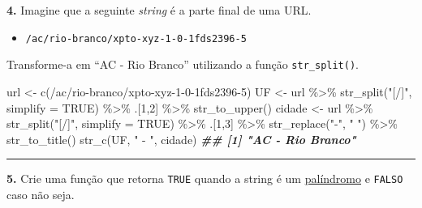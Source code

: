 \documentclass[
]{book}
\newenvironment{Shaded}{\begin{snugshade}}{\end{snugshade}}
\newcommand{\AttributeTok}[1]{\textcolor[rgb]{0.77,0.63,0.00}{#1}}
\newcommand{\ConstantTok}[1]{\textcolor[rgb]{0.00,0.00,0.00}{#1}}
\newcommand{\DecValTok}[1]{\textcolor[rgb]{0.00,0.00,0.81}{#1}}
\newcommand{\DocumentationTok}[1]{\textcolor[rgb]{0.56,0.35,0.01}{\textbf{\textit{#1}}}}
\newcommand{\FunctionTok}[1]{\textcolor[rgb]{0.00,0.00,0.00}{#1}}
\newcommand{\NormalTok}[1]{#1}
\newcommand{\OtherTok}[1]{\textcolor[rgb]{0.56,0.35,0.01}{#1}}
\newcommand{\SpecialCharTok}[1]{\textcolor[rgb]{0.00,0.00,0.00}{#1}}
\newcommand{\StringTok}[1]{\textcolor[rgb]{0.31,0.60,0.02}{#1}}
\providecommand{\tightlist}{%
  \setlength{\itemsep}{0pt}\setlength{\parskip}{0pt}}
\begin{document}
\textbf{4.} Imagine que a seguinte \emph{string} é a parte final de uma URL.

\begin{itemize}
\tightlist
\item
  \texttt{/ac/rio-branco/xpto-xyz-1-0-1fds2396-5}
\end{itemize}

Transforme-a em ``AC - Rio Branco'' utilizando a função \texttt{str\_split()}.

\begin{Shaded}
\begin{Highlighting}[]
\NormalTok{url }\OtherTok{\textless{}{-}} \FunctionTok{c}\NormalTok{(}\StringTok{\textquotesingle{}/ac/rio{-}branco/xpto{-}xyz{-}1{-}0{-}1fds2396{-}5\textquotesingle{}}\NormalTok{)}
\NormalTok{UF }\OtherTok{\textless{}{-}}\NormalTok{ url }\SpecialCharTok{\%\textgreater{}\%}
  \FunctionTok{str\_split}\NormalTok{(}\StringTok{"[/]"}\NormalTok{, }\AttributeTok{simplify =} \ConstantTok{TRUE}\NormalTok{) }\SpecialCharTok{\%\textgreater{}\%} 
\NormalTok{  .[}\DecValTok{1}\NormalTok{,}\DecValTok{2}\NormalTok{] }\SpecialCharTok{\%\textgreater{}\%} 
  \FunctionTok{str\_to\_upper}\NormalTok{()}
\NormalTok{cidade }\OtherTok{\textless{}{-}}\NormalTok{ url }\SpecialCharTok{\%\textgreater{}\%} 
  \FunctionTok{str\_split}\NormalTok{(}\StringTok{"[/]"}\NormalTok{, }\AttributeTok{simplify =} \ConstantTok{TRUE}\NormalTok{) }\SpecialCharTok{\%\textgreater{}\%} 
\NormalTok{  .[}\DecValTok{1}\NormalTok{,}\DecValTok{3}\NormalTok{] }\SpecialCharTok{\%\textgreater{}\%} 
  \FunctionTok{str\_replace}\NormalTok{(}\StringTok{"{-}"}\NormalTok{, }\StringTok{" "}\NormalTok{) }\SpecialCharTok{\%\textgreater{}\%} 
  \FunctionTok{str\_to\_title}\NormalTok{()}
\FunctionTok{str\_c}\NormalTok{(UF, }\StringTok{" {-} "}\NormalTok{, cidade)}
\DocumentationTok{\#\# [1] "AC {-} Rio Branco"}
\end{Highlighting}
\end{Shaded}

\begin{center}\rule{0.5\linewidth}{0.5pt}\end{center}

\textbf{5.} Crie uma função que retorna \texttt{TRUE} quando a string é um \href{https://pt.wikipedia.org/wiki/Pal\%C3\%ADndromo}{palíndromo} e \texttt{FALSO} caso não seja.
\end{document}
